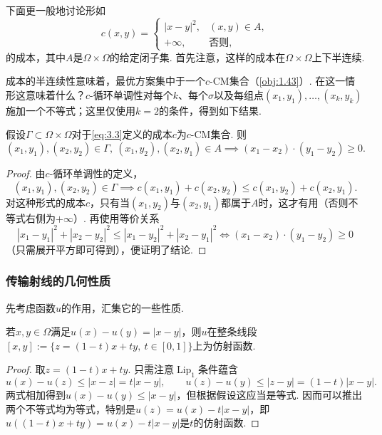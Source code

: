 下面更一般地讨论形如
\begin{equation}\label{eq:3.3}
c(x,y)=\begin{cases}|x-y|^2,&(x,y)\in A,\\+\infty,&\text{否则},\end{cases}
\end{equation}
的成本，其中$A$是$\Omega\times\Omega$的给定闭子集. 首先注意，这样的成本在$\Omega\times\Omega$上下半连续.

\label{idx:i7-p90}
成本的半连续性意味着，最优方案集中于一个$c$-CM集合（\autoref{obj:1.43}）. 在这一情形这意味着什么？$c$-循环单调性对每个$k$、每个$\sigma$以及每组点$(x_1,y_1),\ldots,(x_k,y_k)$施加一个不等式；这里仅使用$k=2$的条件，得到如下结果.

\begin{lemma}\label{obj:3.4}
假设$\Gamma\subset\Omega\times\Omega$对于\eqref{eq:3.3}定义的成本$c$为$c$-CM集合. 则
\[
(x_1,y_1),(x_2,y_2)\in\Gamma,\ (x_1,y_2),(x_2,y_1)\in A
\implies(x_1-x_2)\cdot(y_1-y_2)\ge0.
\]
\end{lemma}
\begin{proof}
由$c$-循环单调性的定义，
\[
(x_1,y_1),(x_2,y_2)\in\Gamma\implies
c(x_1,y_1)+c(x_2,y_2)\le c(x_1,y_2)+c(x_2,y_1).
\]
对这种形式的成本$c$，只有当$(x_1,y_2)$与$(x_2,y_1)$都属于$A$时，这才有用（否则不等式右侧为$+\infty$）. 再使用等价关系
\[
|x_1-y_1|^2+|x_2-y_2|^2\le|x_1-y_2|^2+|x_2-y_1|^2
\iff(x_1-x_2)\cdot(y_1-y_2)\ge0
\]
（只需展开平方即可得到），便证明了结论.
\end{proof}

\subsubsection{传输射线的几何性质}\label{sec:3.1.3}
先考虑函数$u$的作用，汇集它的一些性质.

\begin{lemma}\label{obj:3.5}
若$x,y\in\Omega$满足$u(x)-u(y)=|x-y|$，则$u$在整条线段$[x,y]:=\{z=(1-t)x+ty,\ t\in[0,1]\}$上为仿射函数.
\end{lemma}
\begin{proof}
取$z=(1-t)x+ty$. 只需注意$\operatorname{Lip}_1$条件蕴含
\[
u(x)-u(z)\le|x-z|=t|x-y|,\qquad
u(z)-u(y)\le|z-y|=(1-t)|x-y|.
\]
两式相加得到$u(x)-u(y)\le|x-y|$，但根据假设这应当是等式. 因而可以推出两个不等式均为等式，特别是$u(z)=u(x)-t|x-y|$，即$u((1-t)x+ty)=u(x)-t|x-y|$是$t$的仿射函数.
\end{proof}

